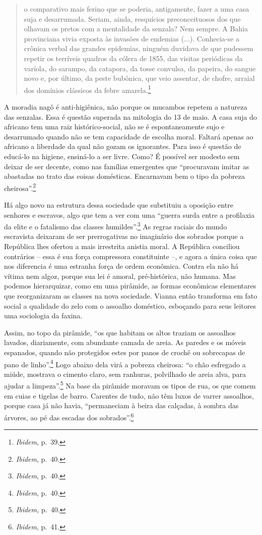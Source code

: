 \begin{quote}
o comparativo mais ferino que se poderia, antigamente, fazer a uma casa
suja e desarrumada. Seriam, ainda, resquícios preconceituosos dos que
olhavam os pretos com a mentalidade da senzala? Nem sempre. A Bahia
provinciana vivia exposta às invasões de endemias (...). Conhecia-se a
crônica verbal das grandes epidemias, ninguém duvidava de que pudessem
repetir os terríveis quadros da cólera de 1855, das visitas periódicas
da varíola, do sarampo, da catapora, da tosse convulsa, da papeira, do
sangue novo e, por último, da peste bubônica, que veio assentar, de
chofre, arraial dos domínios clássicos da febre amarela.\footnote{\emph{Ibidem},
  p.~39.}
\end{quote}

A moradia nagô é anti-higiênica, não porque os mucambos repetem a
natureza das senzalas. Essa é questão superada na mitologia do 13 de
maio. A casa suja do africano tem uma raiz histórico-social, não se é
espontaneamente sujo e desarrumado quando não se tem capacidade de
escolha moral. Faltará apenas ao africano a liberdade da qual não gozam
os ignorantes. Para isso é questão de educá-lo na higiene, ensiná-lo a
ser livre. Como? É possível ser modesto sem deixar de ser decente, como
nas famílias emergentes que ``procuravam imitar as abastadas no trato
das coisas domésticas. Encarnavam bem o tipo da pobreza
cheirosa''.\footnote{\emph{Ibidem}, p.~40.}

Há algo novo na estrutura dessa sociedade que substituiu a oposição
entre senhores e escravos, algo que tem a ver com uma ``guerra surda
entre a profilaxia da elite e o fatalismo das classes
humildes''.\footnote{\emph{Ibidem}, p.~40.} As regras raciais do mundo
escravista deixaram de ser prerrogativas no imaginário dos sobrados
porque a República lhes ofertou a mais irrestrita anistia moral. A
República conciliou contrários -- essa é sua força compressora
constituinte --, e agora a única coisa que nos diferencia é uma estranha
força de ordem econômica. Contra ela não há vítima nem algoz, porque sua
lei é amoral, pré-histórica, não humana. Mas podemos hierarquizar, como
em uma pirâmide, as formas econômicas elementares que reorganizaram as
classes na nova sociedade. Vianna então transforma em fato social a
qualidade do zelo com o assoalho doméstico, esboçando para seus leitores
uma sociologia da faxina.

Assim, no topo da pirâmide, ``os que habitam os altos traziam os
assoalhos lavados, diariamente, com abundante camada de areia. As
paredes e os móveis espanados, quando não protegidos estes por panos de
crochê ou sobrecapas de pano de linho''.\footnote{\emph{Ibidem}, p.~40.}
Logo abaixo dela virá a pobreza cheirosa: ``o chão esfregado a miúde,
mostrava o cimento claro, sem ranhuras, polvilhado de areia alva, para
ajudar a limpeza''.\footnote{\emph{Ibidem,} p.~40.} Na base da pirâmide
moravam os tipos de rua, os que comem em cuias e tigelas de barro.
Carentes de tudo, não têm luxos de varrer assoalhos, porque casa já não
havia, ``permaneciam à beira das calçadas, à sombra das árvores, ao pé
das escadas dos sobrados''.\footnote{\emph{Ibidem}, p.~41.}

